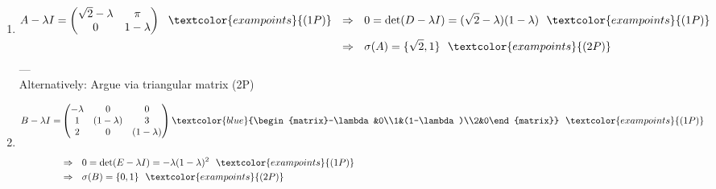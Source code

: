 {\color{solution}
\begin{enumerate}
	\item 
	\begin{align*}
	A-\lambda I=\begin{pmatrix}\sqrt{2}-\lambda&\pi\\0&1-\lambda\end{pmatrix}~~\textcolor{exampoints}{(1P)}~~&\Rightarrow~~0
	=\text{det}(D-\lambda I)
	=(\sqrt{2}-\lambda)(1-\lambda)~~\textcolor{exampoints}{(1P)}\\
	&\Rightarrow~~\sigma(A)=\{\sqrt{2},1\}~~\textcolor{exampoints}{(2P)}
	\end{align*}
	---\\
	Alternatively: Argue via triangular matrix \textcolor{exampoints}{(2P)}
	~\\
	\item 
	\begin{align*}
	B-\lambda I=&\begin{pmatrix}-\lambda&0&0\\1&(1-\lambda)&3\\2&0&(1-\lambda)\end{pmatrix}\textcolor{blue}{\begin{matrix}-\lambda&0\\1&(1-\lambda)\\2&0\end{matrix}}~~\textcolor{exampoints}{(1P)}~~\\
		&\\
	&\Rightarrow~~0
	=\text{det}(E-\lambda I)
	=-\lambda(1-\lambda)^2~~\textcolor{exampoints}{(1P)}\\
	&\Rightarrow~~\sigma(B)=\{0,1\}~~\textcolor{exampoints}{(2P)}
	\end{align*}
\end{enumerate}
}